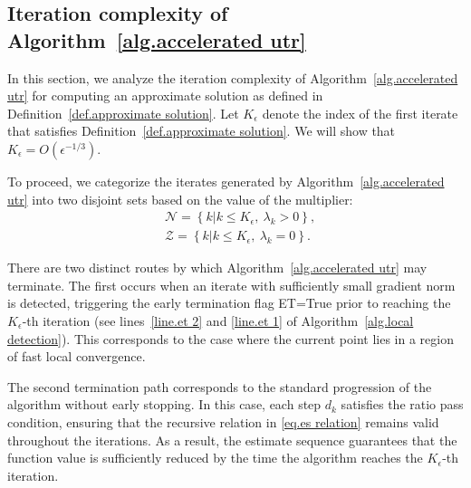 \documentclass{mcom-l}
\numberwithin{equation}{section}
\begin{document}
\subsection{Iteration complexity of Algorithm~\ref{alg.accelerated utr}}
In this section, we analyze the iteration complexity of Algorithm~\ref{alg.accelerated utr} for computing an approximate solution as defined in Definition~\ref{def.approximate solution}. Let $K_\epsilon$ denote the index of the first iterate that satisfies Definition~\ref{def.approximate solution}. We will show that $K_\epsilon = O(\epsilon^{-1/3})$.


To proceed, we categorize the iterates generated by Algorithm~\ref{alg.accelerated utr} into two disjoint sets based on the value of the multiplier:
\begin{equation}
    \label{eq.outer index catagory}
    \begin{aligned}
         & \mathcal{N} = \left \{ k | k\leq K_\epsilon,\ \lambda_k>0\right\}, \\
         & \mathcal{Z} = \left \{k |k\leq K_\epsilon,\ \lambda_k=0\right\}.
    \end{aligned}
\end{equation}

There are two distinct routes by which Algorithm~\ref{alg.accelerated utr} may terminate. The first occurs when an iterate with sufficiently small gradient norm is detected, triggering the early termination flag ET=True prior to reaching the $K_\epsilon$-th iteration (see lines~\ref{line.et 2} and \ref{line.et 1} of Algorithm~\ref{alg.local detection}). This corresponds to the case where the current point lies in a region of fast local convergence.

The second termination path corresponds to the standard progression of the algorithm without early stopping. In this case, each step $d_k$ satisfies the ratio pass condition, ensuring that the recursive relation in \eqref{eq.es relation} remains valid throughout the iterations. As a result, the estimate sequence guarantees that the function value is sufficiently reduced by the time the algorithm reaches the $K_\epsilon$-th iteration.
\end{document}
